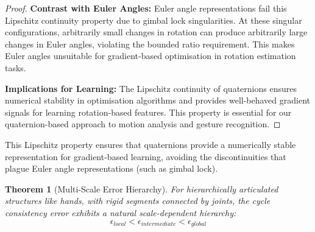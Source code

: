 \documentclass[journal]{IEEEtran}
\theoremstyle{plain}
\newtheorem{theorem}{Theorem}
\begin{document}
\begin{proof}
\textbf{Contrast with Euler Angles:}
Euler angle representations fail this Lipschitz continuity property due to gimbal lock singularities. At these singular configurations, arbitrarily small changes in rotation can produce arbitrarily large changes in Euler angles, violating the bounded ratio requirement. This makes Euler angles unsuitable for gradient-based optimisation in rotation estimation tasks.

\textbf{Implications for Learning:}
The Lipschitz continuity of quaternions ensures numerical stability in optimisation algorithms and provides well-behaved gradient signals for learning rotation-based features. This property is essential for our quaternion-based approach to motion analysis and gesture recognition.
\end{proof}
This Lipschitz property ensures that quaternions provide a numerically stable representation for gradient-based learning, avoiding the discontinuities that plague Euler angle representations (such as gimbal lock).
\begin{theorem}[Multi-Scale Error Hierarchy]
For hierarchically articulated structures like hands, with rigid segments connected by joints, the cycle consistency error exhibits a natural scale-dependent hierarchy:
\[\epsilon_{local} < \epsilon_{intermediate} < \epsilon_{global}\]
\end{theorem}
\end{document}
